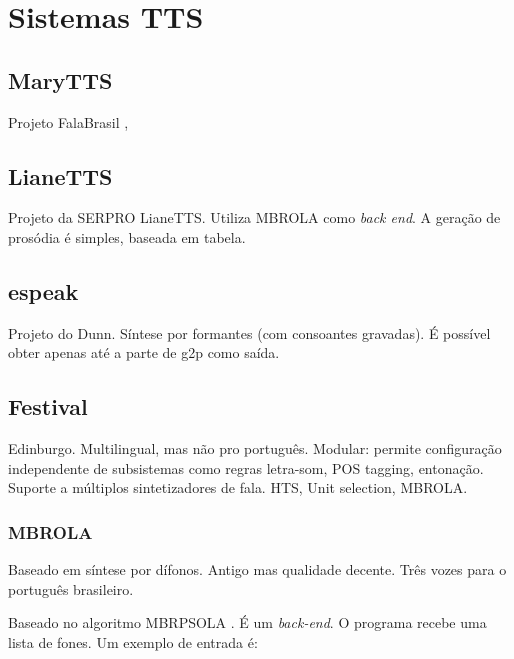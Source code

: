 
\section{Sistemas TTS}
\subsection{MaryTTS}
Projeto FalaBrasil \cite{falabrasil}, \cite{couto}
\subsection{LianeTTS}
Projeto da SERPRO LianeTTS. Utiliza MBROLA como \emph{back end}. A geração de
prosódia é simples, baseada em tabela.
\subsection{espeak}
Projeto do Dunn. Síntese por formantes (com consoantes gravadas). É possível
obter apenas até a parte de g2p como saída.
\subsection{Festival}
Edinburgo. Multilingual, mas não pro português. Modular: permite configuração
independente de subsistemas como regras letra-som, POS tagging, entonação.
Suporte a múltiplos sintetizadores de fala. HTS, Unit selection, MBROLA.

\subsubsection{MBROLA}
Baseado em síntese por dífonos. Antigo mas qualidade decente. Três vozes para o
português brasileiro. \cite{mbrola} %

Baseado no algoritmo {MBRPSOLA} \cite{mbrpsola}. É um \emph{back-end}. O programa recebe uma lista de fones. Um exemplo de entrada é:

